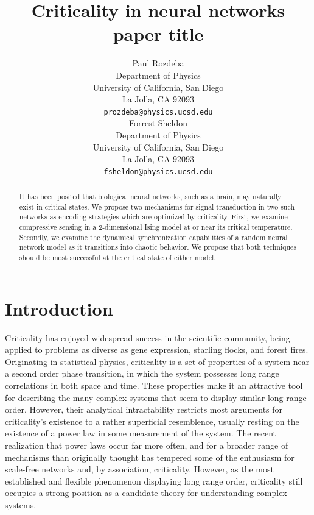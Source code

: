 \documentclass{article} %
\title{Criticality in neural networks paper title}
\author{
Paul Rozdeba%
\\
Department of Physics\\
University of California, San Diego\\
La Jolla, CA 92093 \\
\texttt{prozdeba@physics.ucsd.edu} \\
\And
Forrest Sheldon \\
Department of Physics\\
University of California, San Diego\\
La Jolla, CA 92093 \\
\texttt{fsheldon@physics.ucsd.edu} \\
}
\begin{document}
\maketitle

\begin{abstract}
It has been posited that biological neural networks, such as a brain, may
naturally exist in critical states.  We propose two mechanisms for signal
transduction in two such networks as encoding strategies which are optimized by
criticality.  First, we examine compressive sensing in a 2-dimensional Ising
model at or near its critical temperature.  Secondly, we examine the dynamical
synchronization capabilities of a random neural network model as it transitions
into chaotic behavior.  We propose that both techniques should be most successful
at the critical state of either model.
\end{abstract}

\section{Introduction}
Criticality has enjoyed widespread success in the scientific community, being
applied to problems as diverse as gene expression, starling flocks, and forest
fires.\cite{Chialvo2010}  Originating in statistical physics, criticality is a set
of properties of a system near a second order phase transition, in which the
system possesses long range correlations in both space and time.  These
properties make it an attractive tool for describing the many complex systems
that seem to display similar long range order.  However, their analytical
intractability restricts most arguments for criticality's existence to a
rather superficial resemblence, usually resting on the existence of a power
law in some measurement of the system. The recent realization that power laws
occur far more often, and for a broader range of mechanisms than originally
thought has tempered some of the enthusiasm for scale-free networks and, by
association, criticality.\cite{Keller2005} However, as the most established and
flexible phenomenon displaying long range order, criticality still occupies
a strong position as a candidate theory for understanding complex systems.
\end{document}
